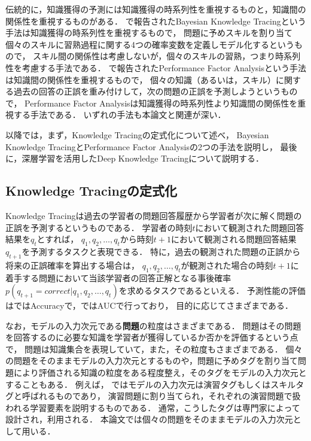 伝統的に，知識獲得の予測には知識獲得の時系列性を重視するものと，知識間の関係性を重視するものがある．
\cite{corbett1994knowledge}で報告されたBayesian Knowledge Tracingという手法は知識獲得の時系列性を重視するもので，
問題に予めスキルを割り当て個々のスキルに習熟過程に関する4つの確率変数を定義しモデル化するというもので，
スキル間の関係性は考慮しないが，個々のスキルの習熟，つまり時系列性を考慮する手法である．
\cite{pavlik2009performance}で報告されたPerformance Factor Analysisという手法は知識間の関係性を重視するもので，
個々の知識（あるいは，スキル）に関する過去の回答の正誤を重み付けして，次の問題の正誤を予測しようというもので，
Performance Factor Analysisは知識獲得の時系列性より知識間の関係性を重視する手法である．
いずれの手法も本論文と関連が深い．


以降では，まず，Knowledge Tracingの定式化について述べ，
Bayesian Knowledge TracingとPerformance Factor Analysisの2つの手法を説明し，
最後に，深層学習を活用したDeep Knowledge Tracingについて説明する．











\subsection{Knowledge Tracingの定式化}
Knowledge Tracingは過去の学習者の問題回答履歴から学習者が次に解く問題の正誤を予測するというものである．
学習者の時刻$t$において観測された問題回答結果を$q_{t}$とすれば，
$q_1, q_2, \dots, q_t$から時刻$t+1$において観測される問題回答結果$q_{t+1}$を予測するタスクと表現できる．
特に，過去の観測された問題の正誤から将来の正誤確率を算出する場合は，
$q_1, q_2, \dots, q_t$が観測された場合の時刻$t+1$に着手する問題において当該学習者の回答正解となる事後確率
$p(q_{t+1} = correct|q_1, q_2, \dots, q_t)$を求めるタスクであるといえる．
予測性能の評価は\cite{yudelson2013individualized, falakmasir2015spectral}ではAccuracyで，\cite{piech2015deep}ではAUCで行っており，
目的に応じてさまざまである．

なお，モデルの入力次元である{\bf 問題}の粒度はさまざまである．
問題はその問題を回答するのに必要な知識を学習者が獲得しているか否かを評価するという点で，
問題は知識集合を表現していて，また，その粒度もさまざまである．
個々の問題をそのままモデルの入力次元とするものや，問題に予めタグを割り当て問題により評価される知識の粒度をある程度整え，そのタグをモデルの入力次元とすることもある．
例えば，
\cite{piech2015deep}ではモデルの入力次元は演習タグもしくはスキルタグと呼ばれるものであり，
演習問題に割り当てられ，それぞれの演習問題で扱われる学習要素を説明するものである．
通常，こうしたタグは専門家によって設計され，利用される．
本論文では個々の問題をそのままモデルの入力次元として用いる．


